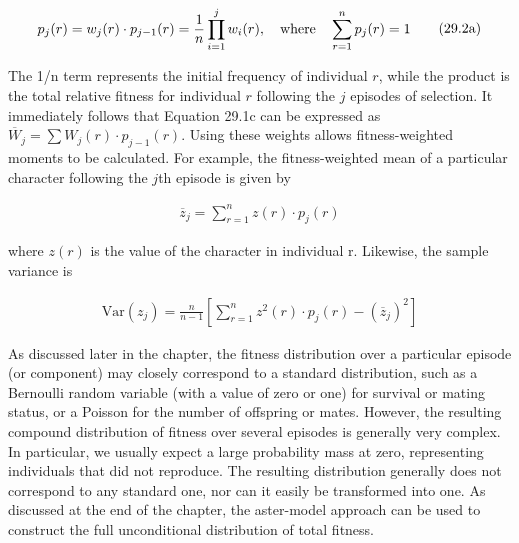 \documentclass{article}
\begin{document}
\begin{equation}
\begin{align*}p_j(r)=w_j(r)\cdot p_{j-1}(r)=\frac{1}{n}\prod\limits_{i=1}^j w_i(r),\quad{\rm where}\quad\sum\limits_{r=1}^n p_j(r)=1\end{align*}
\tag{29.2a}
\label{eq:29_2a}
\end{equation}

The 1/n term represents the initial frequency of individual  $ r $, while the product is the total relative fitness for individual  $ r $ following the  $ j $ episodes of selection. It immediately follows that Equation 29.1c can be expressed as  $ \overline{W}_j = \sum W_j(r) \cdot p_{j-1}(r) $. Using these weights allows fitness-weighted moments to be calculated. For example, the fitness-weighted mean of a particular character following the  $ j $th episode is given by

\begin{equation}
\begin{align*}\overline{z}_j=\sum\limits_{r=1}^n z(r)\cdot p_j(r)\end{align*}
\tag{29.2b}
\label{eq:29_2b}
\end{equation}

where  $ z(r) $ is the value of the character in individual r. Likewise, the sample variance is

\begin{equation}
\begin{align*}\mathrm{Var}(z_j)=\frac{n}{n-1}\left[\sum\limits_{r=1}^n z^2(r)\cdot p_j(r)-(\overline{z}_j)^2\right]\end{align*}
\tag{29.2c}
\label{eq:29_2c}
\end{equation}

As discussed later in the chapter, the fitness distribution over a particular episode (or component) may closely correspond to a standard distribution, such as a Bernoulli random variable (with a value of zero or one) for survival or mating status, or a Poisson for the number of offspring or mates. However, the resulting compound distribution of fitness over several episodes is generally very complex. In particular, we usually expect a large probability mass at zero, representing individuals that did not reproduce. The resulting distribution generally does not correspond to any standard one, nor can it easily be transformed into one. As discussed at the end of the chapter, the aster-model approach can be used to construct the full unconditional distribution of total fitness.
\end{document}
